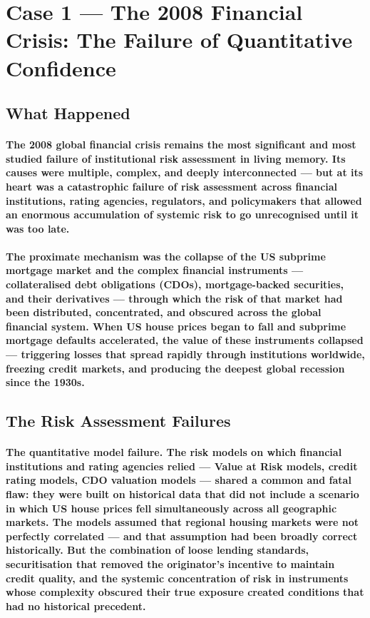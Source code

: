 \section{Case 1 — The 2008 Financial Crisis: The Failure of Quantitative Confidence}

\subsection{What Happened}
\paragraph{The 2008 global financial crisis remains the most significant and most studied failure of institutional risk assessment in living memory. Its causes were multiple, complex, and deeply interconnected — but at its heart was a catastrophic failure of risk assessment across financial institutions, rating agencies, regulators, and policymakers that allowed an enormous accumulation of systemic risk to go unrecognised until it was too late.}
\paragraph{The proximate mechanism was the collapse of the US subprime mortgage market and the complex financial instruments — collateralised debt obligations (CDOs), mortgage-backed securities, and their derivatives — through which the risk of that market had been distributed, concentrated, and obscured across the global financial system. When US house prices began to fall and subprime mortgage defaults accelerated, the value of these instruments collapsed — triggering losses that spread rapidly through institutions worldwide, freezing credit markets, and producing the deepest global recession since the 1930s.}

\subsection{The Risk Assessment Failures}
\paragraph{\textbf{The quantitative model failure}. The risk models on which financial institutions and rating agencies relied — Value at Risk models, credit rating models, CDO valuation models — shared a common and fatal flaw: they were built on historical data that did not include a scenario in which US house prices fell simultaneously across all geographic markets. The models assumed that regional housing markets were not perfectly correlated — and that assumption had been broadly correct historically. But the combination of loose lending standards, securitisation that removed the originator's incentive to maintain credit quality, and the systemic concentration of risk in instruments whose complexity obscured their true exposure created conditions that had no historical precedent.}
